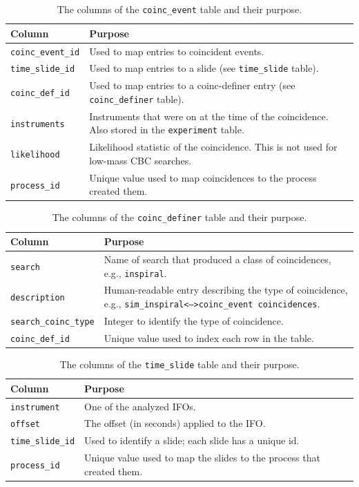 \begin{table}
\label{tab:coinc_event}
\center
\begin{tabular}{l | p{9cm}}
Column      &   Purpose     \\
\hline \hline
\texttt{coinc\_event\_id}   &   Used to map entries to coincident events. \\
\hline
\texttt{time\_slide\_id}    &   Used to map entries to a slide (see \texttt{time\_slide} table). \\
\hline
\texttt{coinc\_def\_id}     &   Used to map entries to a coinc-definer entry (see \texttt{coinc\_definer} table). \\
\hline
\texttt{instruments}        &   Instruments that were on at the time of the coincidence. Also stored in the \texttt{experiment} table. \\
\hline
\texttt{likelihood}         &   Likelihood statistic of the coincidence. This is not used for low-mass \ac{CBC} searches. \\
\hline
\texttt{process\_id}        &   Unique value used to map coincidences to the process created them.
\end{tabular}
\caption{The columns of the \texttt{coinc\_event} table and their purpose.}
\end{table}

\begin{table}
\label{tab:coinc_definer}
\center
\begin{tabular}{l | p{9cm}}
Column      &   Purpose     \\
\hline \hline
\texttt{search}     &       Name of search that produced a class of coincidences, e.g., \texttt{inspiral}. \\
\hline
\texttt{description}    &   Human-readable entry describing the type of coincidence, e.g., \texttt{sim\_inspiral<-->coinc\_event coincidences}. \\
\hline
\texttt{search\_coinc\_type}    &   Integer to identify the type of coincidence. \\
\hline
\texttt{coinc\_def\_id}     &   Unique value used to index each row in the table.
\end{tabular}
\caption{The columns of the \texttt{coinc\_definer} table and their purpose.}
\end{table}

\begin{table}
\label{tab:time_slide}
\center
\begin{tabular}{m{3.5cm} | p{9cm}}
Column      &   Purpose     \\
\hline \hline
\texttt{instrument} &   One of the analyzed \acp{IFO}. \\
\hline
\texttt{offset}     &   The offset (in seconds) applied to the \ac{IFO}. \\
\hline
\texttt{time\_slide\_id}    &   Used to identify a slide; each slide has a unique id. \\
\hline
\texttt{process\_id}    &   Unique value used to map the slides to the process that created them.
\end{tabular}
\caption{The columns of the \texttt{time\_slide} table and their purpose.}
\end{table}

